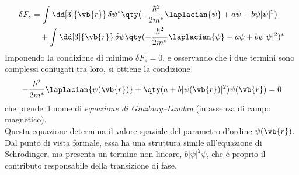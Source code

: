 \begin{equation}
\begin{split}
   \delta F_s
   &= \int \dd[3]{\vb{r}} \,
   \delta \psi^* \qty(
   -\frac{\hbar^2}{2m^*} \laplacian{\psi}
   + a\psi + b\psi |\psi|^2
   )
   \\
   &\quad + \int \dd[3]{\vb{r}} \,
   \delta \psi \qty(
   -\frac{\hbar^2}{2m^*} \laplacian{\psi}
   + a\psi + b\psi |\psi|^2
   )^*
\end{split}
\label{eq:variazione_energia_libera_ginzburg_landau}
\end{equation}
Imponendo la condizione di minimo $\delta F_s = 0$, e osservando che i due termini sono complessi coniugati tra loro, si ottiene la condizione
\begin{equation}
   -\frac{\hbar^2}{2m^*} \laplacian{\psi(\vb{r})}
   + \qty(a + b |\psi(\vb{r})|^2)\psi(\vb{r})
   = 0
   \label{eq:ginzburg_landau_equation_no_magnetic_field}
\end{equation}
che prende il nome di \emph{equazione di Ginzburg--Landau} (in assenza di campo magnetico).\\
Questa equazione determina il valore spaziale del parametro d'ordine $\psi(\vb{r})$. Dal punto di vista formale, essa ha una struttura simile all'equazione di Schrödinger, ma presenta un termine non lineare, $b|\psi|^2\psi$, che è proprio il contributo responsabile della transizione di fase.
